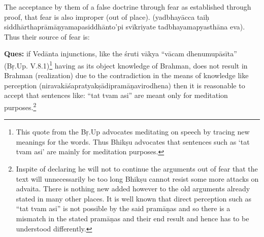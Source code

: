 \vskip 3pt

The acceptance by them of a false doctrine through fear as established through proof, that fear is also improper (out of place). (yadbhayācca taiḥ siddhārthaprāmāṇyamapasiddhānto’pi svīkriyate tadbhayamapyasthāna eva). Thus their source of fear is: 

\vskip 3pt

\textbf{Ques:} if Vedānta injunctions, like the śruti vākya “vācam dhenumupā\-sīta” (Bṛ.Up. V.8.1)\footnote{This quote from the Bṛ.Up advocates meditating on speech by tracing new meanings for the words. Thus Bhikṣu advocates that sentences such as ‘tat tvam asi’ are mainly for meditation purposes.}  having as its object knowledge of Brahman, does not result in Brahman (realization) due to the contradiction in the means of knowledge like perception (niravakāśapratyakṣādipramāṇa\-virodhena) then it is reasonable to accept that sentences like: “tat tvam asi” are meant only for meditation purposes.\footnote{Inspite of declaring he will not to continue the arguments out of fear that the text will unnecessarily be too long Bhikṣu cannot resist some more attacks on advaita. There is nothing new added however to the old arguments already stated in many other places. It is well known that direct perception such as “tat tvam asi” is not possible by the said pramāṇas and so there is a mismatch in the stated pramāṇas and their end result and hence has to be understood differently.} 

